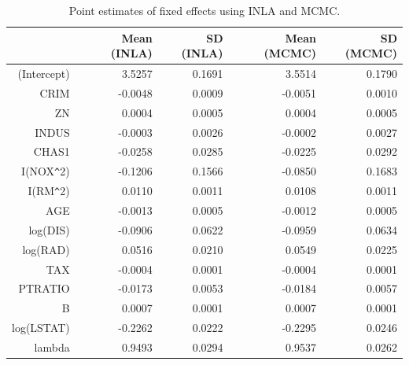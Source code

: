 \documentclass[article]{jss}
\begin{document}
\begin{table}[ht]
\centering
\begin{tabular}{rrrrr}
  \hline
 & Mean (INLA) & SD (INLA) & Mean (MCMC) & SD (MCMC) \\ 
  \hline
(Intercept) & 3.5257 & 0.1691 & 3.5514 & 0.1790 \\ 
  CRIM & -0.0048 & 0.0009 & -0.0051 & 0.0010 \\ 
  ZN & 0.0004 & 0.0005 & 0.0004 & 0.0005 \\ 
  INDUS & -0.0003 & 0.0026 & -0.0002 & 0.0027 \\ 
  CHAS1 & -0.0258 & 0.0285 & -0.0225 & 0.0292 \\ 
  I(NOX\verb|^|2) & -0.1206 & 0.1566 & -0.0850 & 0.1683 \\ 
  I(RM\verb|^|2) & 0.0110 & 0.0011 & 0.0108 & 0.0011 \\ 
  AGE & -0.0013 & 0.0005 & -0.0012 & 0.0005 \\ 
  log(DIS) & -0.0906 & 0.0622 & -0.0959 & 0.0634 \\ 
  log(RAD) & 0.0516 & 0.0210 & 0.0549 & 0.0225 \\ 
  TAX & -0.0004 & 0.0001 & -0.0004 & 0.0001 \\ 
  PTRATIO & -0.0173 & 0.0053 & -0.0184 & 0.0057 \\ 
  B & 0.0007 & 0.0001 & 0.0007 & 0.0001 \\ 
  log(LSTAT) & -0.2262 & 0.0222 & -0.2295 & 0.0246 \\ 
  lambda & 0.9493 & 0.0294 & 0.9537 & 0.0262 \\ 
   \hline
\end{tabular}
\caption{Point estimates of fixed effects using INLA and MCMC.} 
\label{tab:leroux}
\end{table}
\end{document}
